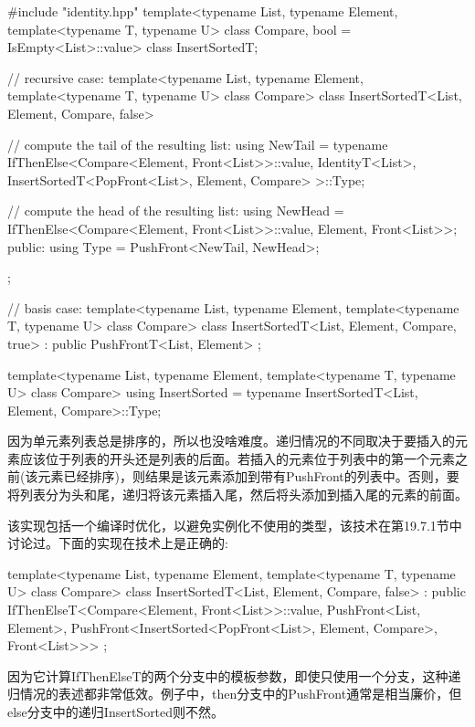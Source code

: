 \begin{cpp}
#include "identity.hpp"
template<typename List, typename Element,
		template<typename T, typename U> class Compare,
		bool = IsEmpty<List>::value>
class InsertSortedT;

// recursive case:
template<typename List, typename Element,
		template<typename T, typename U> class Compare>
class InsertSortedT<List, Element, Compare, false>
{
	// compute the tail of the resulting list:
	using NewTail =
		typename IfThenElse<Compare<Element, Front<List>>::value,
							IdentityT<List>,
							InsertSortedT<PopFront<List>, Element, Compare>
				>::Type;
				
	// compute the head of the resulting list:
	using NewHead = IfThenElse<Compare<Element, Front<List>>::value,
								Element,
								Front<List>>;
	public:
	using Type = PushFront<NewTail, NewHead>;
};

// basis case:
template<typename List, typename Element,
		template<typename T, typename U> class Compare>
class InsertSortedT<List, Element, Compare, true>
: public PushFrontT<List, Element>
{
};

template<typename List, typename Element,
		template<typename T, typename U> class Compare>
using InsertSorted = typename InsertSortedT<List, Element, Compare>::Type;
\end{cpp}

因为单元素列表总是排序的，所以也没啥难度。递归情况的不同取决于要插入的元素应该位于列表的开头还是列表的后面。若插入的元素位于列表中的第一个元素之前(该元素已经排序)，则结果是该元素添加到带有PushFront的列表中。否则，要将列表分为头和尾，递归将该元素插入尾，然后将头添加到插入尾的元素的前面。

该实现包括一个编译时优化，以避免实例化不使用的类型，该技术在第19.7.1节中讨论过。下面的实现在技术上是正确的:

\begin{cpp}
template<typename List, typename Element,
		template<typename T, typename U> class Compare>
class InsertSortedT<List, Element, Compare, false>
: public IfThenElseT<Compare<Element, Front<List>>::value,
					PushFront<List, Element>,
					PushFront<InsertSorted<PopFront<List>,
											Element, Compare>,
							Front<List>>>
{
};
\end{cpp}

因为它计算IfThenElseT的两个分支中的模板参数，即使只使用一个分支，这种递归情况的表述都非常低效。例子中，then分支中的PushFront通常是相当廉价，但else分支中的递归InsertSorted则不然。

